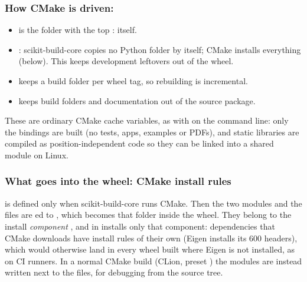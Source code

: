 \subsubsection{How CMake is driven: \texorpdfstring{}{[tool.scikit-build]}}
\begin{itemize}
  \item {} is the folder with the top :  itself.
  \item {}: scikit-build-core copies no Python folder by itself; CMake
        installs everything (below). This keeps development leftovers out of the wheel.
  \item {} keeps a build folder per wheel tag, so rebuilding is incremental.
  \item {} keeps build folders and documentation out of the source package.
\end{itemize}
These are ordinary CMake cache variables, as with  on the command line: only the bindings
are built (no tests, apps, examples or PDFs), and static libraries are compiled as
position-independent code so they can be linked into a shared module on Linux.

\subsubsection{What goes into the wheel: CMake install rules}
 is defined only when scikit-build-core runs CMake. Then the two modules and the
 files are ed to , which becomes that folder
inside the wheel. They belong to the install \emph{component} , and
 in  installs only that component:
dependencies that CMake downloads have install rules of their own (Eigen installs its 600 headers),
which would otherwise land in every wheel built where Eigen is not installed, as on CI runners. In a normal CMake build (CLion, preset ) the modules are
instead written next to the  files, for debugging from the source tree.

